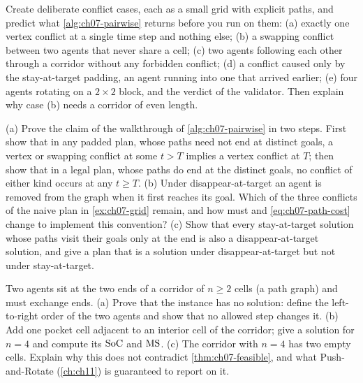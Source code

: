 \begin{exercise}[\difficulty{2}]
\label{exr:ch07-conflict-cases}
Create deliberate conflict cases, each as a small grid with explicit paths,
and predict what \cref{alg:ch07-pairwise} returns before you run
 on them: (a) exactly one vertex conflict at a single
time step and nothing else; (b) a swapping conflict between two agents that
never share a cell; (c) two agents following each other through a corridor
without any forbidden conflict; (d) a conflict caused only by the
stay-at-target padding, an agent running into one that arrived earlier;
(e) four agents rotating on a $2 \times 2$ block, and the verdict of the
validator. Then explain why case (b) needs a corridor of even length.
\end{exercise}

\begin{exercise}[\difficulty{2}]
\label{exr:ch07-horizon}
(a) Prove the claim of the walkthrough of \cref{alg:ch07-pairwise} in two
steps. First show that in any padded plan, whose paths need not end at
distinct goals, a vertex or swapping conflict at some $t > T$ implies a
vertex conflict at $T$; then show that in a legal plan, whose paths do end at
the distinct goals, no conflict of either kind occurs at any $t \ge T$. (b) Under disappear-at-target an agent is
removed from the graph when it first reaches its goal. Which of the three
conflicts of the naive plan in \cref{ex:ch07-grid} remain, and how must
\MapfPosition and \cref{eq:ch07-path-cost} change to implement this
convention? (c) Show that every stay-at-target solution whose paths visit
their goals only at the end is also a disappear-at-target solution, and give
a plan that is a solution under disappear-at-target but not under
stay-at-target.
\end{exercise}

\begin{exercise}[\difficulty{2}]
\label{exr:ch07-corridor}
Two agents sit at the two ends of a corridor of $n \ge 2$ cells (a path
graph) and must exchange ends. (a) Prove that the instance has no solution:
define the left-to-right order of the two agents and show that no allowed
step changes it. (b) Add one pocket cell adjacent to an interior cell of the
corridor; give a solution for $n = 4$ and compute its $\mathrm{SoC}$ and
$\mathrm{MS}$. (c) The corridor with $n = 4$ has two empty cells. Explain why
this does not contradict \cref{thm:ch07-feasible}, and what Push-and-Rotate
(\cref{ch:ch11}) is guaranteed to report on it.
\end{exercise}


